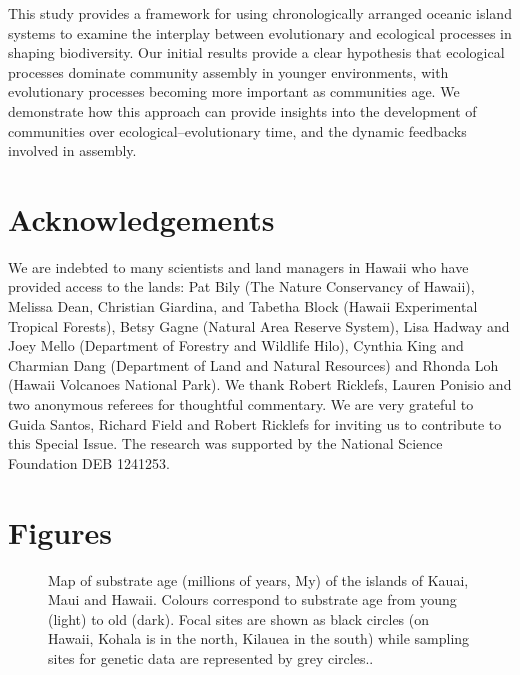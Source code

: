 This study provides a framework for using chronologically arranged
oceanic island systems to examine the interplay between evolutionary
and ecological processes in shaping biodiversity. Our initial results
provide a clear hypothesis that ecological processes dominate
community assembly in younger environments, with evolutionary
processes becoming more important as communities age. We demonstrate
how this approach can provide insights into the development of
communities over ecological–evolutionary time, and the dynamic
feedbacks involved in assembly.


\section*{Acknowledgements} 

We are indebted to many scientists and land managers in Hawaii who
have provided access to the lands: Pat Bily (The Nature Conservancy of
Hawaii), Melissa Dean, Christian Giardina, and Tabetha Block (Hawaii
Experimental Tropical Forests), Betsy Gagne (Natural Area Reserve
System), Lisa Hadway and Joey Mello (Department of Forestry and
Wildlife Hilo), Cynthia King and Charmian Dang (Department of Land and
Natural Resources) and Rhonda Loh (Hawaii Volcanoes National Park). We
thank Robert Ricklefs, Lauren Ponisio and two anonymous referees for
thoughtful commentary. We are very grateful to Guida Santos, Richard
Field and Robert Ricklefs for inviting us to contribute to this
Special Issue. The research was supported by the National Science
Foundation DEB 1241253.





\clearpage

\section*{Figures}

\begin{figure}
  \caption[Map of substrate age]{Map of substrate age (millions of
    years, My) of the islands of Kauai, Maui and Hawaii. Colours
    correspond to substrate age from young (light) to old
    (dark). Focal sites are shown as black circles (on Hawaii, Kohala
    is in the north, Kilauea in the south) while sampling sites for
    genetic data are represented by grey circles..}
  \label{fig:map}
\end{figure}

